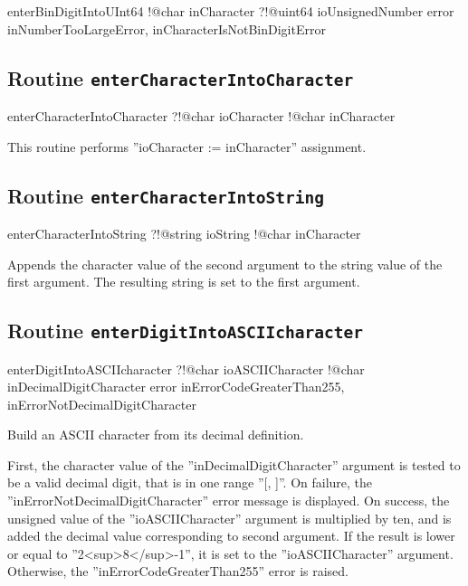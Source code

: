 {\begin{galgascode}
enterBinDigitIntoUInt64 !@char inCharacter
                        ?!@uint64 ioUnsignedNumber
                        error inNumberTooLargeError,
                              inCharacterIsNotBinDigitError
\end{galgascode}

\subsection{Routine \texttt{enterCharacterIntoCharacter}}

\begin{galgascode}
enterCharacterIntoCharacter ?!@char ioCharacter
                            !@char inCharacter
\end{galgascode}

This routine performs ''ioCharacter := inCharacter'' assignment.

\subsection{Routine \texttt{enterCharacterIntoString}}

\begin{galgascode}
enterCharacterIntoString ?!@string ioString
                         !@char inCharacter
\end{galgascode}

Appends the character value of the second argument to the string value of the first argument. The resulting string is set to the first argument.

\subsection{Routine \texttt{enterDigitIntoASCIIcharacter}}

\begin{galgascode}
enterDigitIntoASCIIcharacter ?!@char ioASCIICharacter
                             !@char inDecimalDigitCharacter
                             error inErrorCodeGreaterThan255,
                                   inErrorNotDecimalDigitCharacter
\end{galgascode}

Build an ASCII character from its decimal definition.

First, the character value of the ''inDecimalDigitCharacter'' argument is tested to be a valid decimal digit, that is in one range ''[\textquotesingle, \textquotesingle]''. On failure, the ''inErrorNotDecimalDigitCharacter'' error message is displayed. On success, the unsigned value of the ''ioASCIICharacter'' argument is multiplied by ten, and is added the decimal value corresponding to second argument. If the result is lower or equal to ''2<sup>8</sup>-1'', it is set to the ''ioASCIICharacter'' argument. Otherwise, the ''inErrorCodeGreaterThan255'' error is raised.

}
